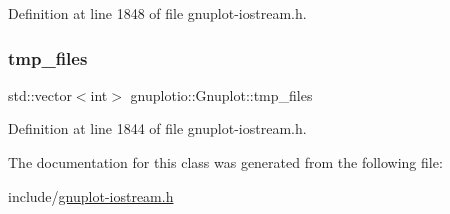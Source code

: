 Definition at line 1848 of file gnuplot-\/iostream.\+h.

\mbox{\label{classgnuplotio_1_1_gnuplot_a92a4f6322e486de17db4507a5fc77348}} 
\subsubsection{\texorpdfstring{tmp\+\_\+files}{tmp\_files}}
{\footnotesize\ttfamily std\+::vector$<$int$>$ gnuplotio\+::\+Gnuplot\+::tmp\+\_\+files}



Definition at line 1844 of file gnuplot-\/iostream.\+h.



The documentation for this class was generated from the following file\+:\begin{DoxyCompactItemize}
\item 
include/\hyperlink{gnuplot-iostream_8h}{gnuplot-\/iostream.\+h}\end{DoxyCompactItemize}
